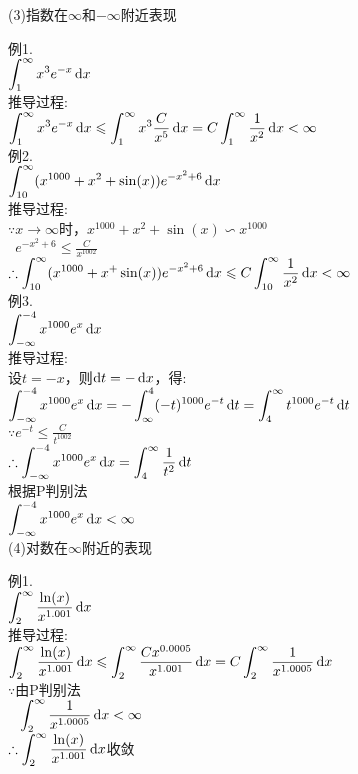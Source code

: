 (3)指数在$\infty$和$-\infty$附近表现
{\par\centering
{}
\par}
例1.\\
$\displaystyle\int_1^{\infty}x^3e^{-x}\mathop{}\!\mathrm{d} x$\\
推导过程:\\
$\displaystyle\int_1^{\infty}x^3e^{-x}\mathop{}\!\mathrm{d} x\leqslant\int_1^{\infty}x^3\frac{C}{x^5}\mathop{}\!\mathrm{d} x=C\int_1^{\infty}\frac{1}{x^2}\mathop{}\!\mathrm{d} x<\infty$\\[1ex]

例2.\\
$\displaystyle\int_{10}^{\infty}(x^{1000}+x^2+\sin(x))e^{-x^2+6}\mathop{}\!\mathrm{d} x$\\
推导过程:\\
$\because x\to\infty$时，$x^{1000}+x^2+\sin(x)\backsim x^{1000}$\\
$\displaystyle\phantom{\because}e^{-x^2+6}\leqslant\frac{C}{x^{1002}}$\\
$\displaystyle\therefore\int_{10}^{\infty}(x^{1000}+x^+\sin(x))e^{-x^2+6}\mathop{}\!\mathrm{d} x\leqslant C\int_{10}^{\infty}\frac{1}{x^2}\mathop{}\!\mathrm{d} x<\infty$\\[1ex]

例3.\\
$\displaystyle\int_{-\infty}^{-4}x^{1000}e^x\mathop{}\!\mathrm{d} x$\\
推导过程:\\
设$t=-x$，则$\mathop{}\!\mathrm{d} t=-\mathop{}\!\mathrm{d} x$，得:\\
$\displaystyle\int_{-\infty}^{-4}x^{1000}e^x\mathop{}\!\mathrm{d} x=-\int_{\infty}^4(-t)^{1000}e^{-t}\mathop{}\!\mathrm{d} t=\int_4^{\infty}t^{1000}e^{-t}\mathop{}\!\mathrm{d} t$\\
$\displaystyle\because e^{-t}\leqslant\frac{C}{t^{1002}}$\\
$\displaystyle\therefore\int_{-\infty}^{-4}x^{1000}e^x\mathop{}\!\mathrm{d} x=\int_4^{\infty}\frac{1}{t^2}\mathop{}\!\mathrm{d} t$\\
根据P判别法\\
$\displaystyle\int_{-\infty}^{-4}x^{1000}e^x\mathop{}\!\mathrm{d} x<\infty$\\[2ex]

(4)对数在$\infty$附近的表现
{\par\centering
{}
\par}
例1.\\
$\displaystyle\int_2^{\infty}\frac{\ln(x)}{x^{1.001}}\mathop{}\!\mathrm{d} x$\\
推导过程:\\
$\displaystyle\int_2^{\infty}\frac{\ln(x)}{x^{1.001}}\mathop{}\!\mathrm{d} x\leqslant\int_2^{\infty}\frac{Cx^{0.0005}}{x^{1.001}}\mathop{}\!\mathrm{d} x=C\int_2^{\infty}\frac{1}{x^{1.0005}}\mathop{}\!\mathrm{d} x$\\
$\because$由P判别法\\
$\displaystyle\phantom{\because}\int_2^{\infty}\frac{1}{x^{1.0005}}\mathop{}\!\mathrm{d} x<\infty$\\
$\displaystyle\therefore\int_2^{\infty}\frac{\ln(x)}{x^{1.001}}\mathop{}\!\mathrm{d} x$收敛\\

